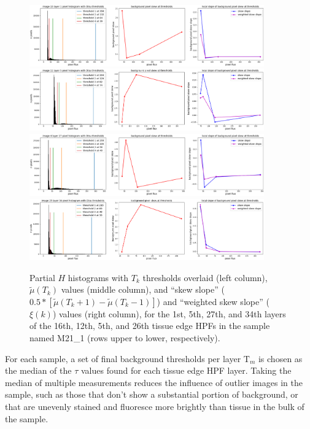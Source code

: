 \documentclass[letterpaper,11pt]{article}
\newcommand{\Tau}{\mathrm{T}}
\begin{document}
\begin{figure}[!ht]
\centering
\includegraphics[width=0.9\textwidth]{images/masking/thresholds_image_15_layer_1}
\includegraphics[width=0.9\textwidth]{images/masking/thresholds_image_11_layer_5}
\includegraphics[width=0.9\textwidth]{images/masking/thresholds_image_4_layer_27}
\includegraphics[width=0.9\textwidth]{images/masking/thresholds_image_25_layer_34}
\caption{\footnotesize Partial $H$ histograms with $T_{k}$ thresholds overlaid (left column), $\widetilde{\mu}(T_{k})$ values (middle column), and ``skew slope'' ($0.5*\left[\widetilde{\mu}(T_{k}+1) - \widetilde{\mu}(T_{k}-1)\right]$) and ``weighted skew slope'' ($\xi(k)$) values (right column), for the 1st, 5th, 27th, and 34th layers of the 16th, 12th, 5th, and 26th tissue edge HPFs in the sample named M21\_1 (rows upper to lower, respectively).}
\label{fig:histograms_with_otsu_thresholds}
\end{figure}

For each sample, a set of final background thresholds per layer $\Tau_{m}$ is chosen as the median of the $\tau$ values found for each tissue edge HPF layer. Taking the median of multiple measurements reduces the influence of outlier images in the sample, such as those that don't show a substantial portion of background, or that are unevenly stained and fluoresce more brightly than tissue in the bulk of the sample. 
\end{document}
